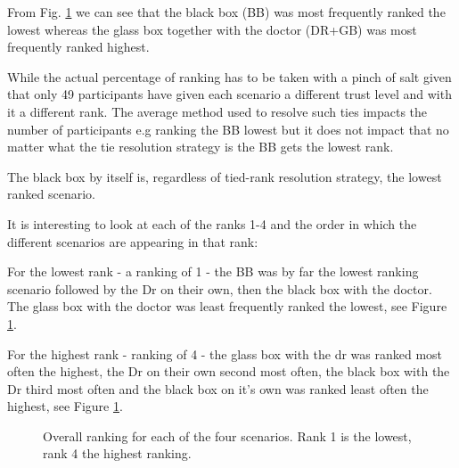 \documentclass[manuscript,screen,review]{acmart}
\begin{document}
From Fig. \ref{fig:overall-ranking} we can see that the black box (BB) was most frequently ranked the lowest whereas the glass box together with the doctor (DR+GB) was most frequently ranked highest.

While the actual percentage of ranking has to be taken with a pinch of salt given that only 49 participants have given each scenario a different trust level and with it a different rank. The average method used to resolve such ties impacts the number of participants e.g ranking the BB lowest but it does not impact that no matter what the tie resolution strategy is the BB gets the lowest rank.

The black box by itself is, regardless of tied-rank resolution strategy, the lowest ranked scenario.

It is interesting to look at each of the ranks 1-4 and the order in which the different scenarios are appearing in that rank:

For the lowest rank - a ranking of 1 - the BB was by far the lowest ranking scenario followed by the Dr on their own, then the black box with the doctor. The glass box with the doctor was  least frequently ranked the lowest, see Figure \ref{fig:overall-ranking}.

For the highest rank - ranking of 4 - the glass box with the dr was ranked most often the highest, the Dr on their own second most often, the black box with the Dr third most often and the black box on it's own was ranked least often the highest, see Figure \ref{fig:overall-ranking}.

\begin{figure}[h]
    \caption{Overall ranking for each of the four scenarios. Rank 1 is the lowest, rank 4 the highest ranking.}
    \label{fig:overall-ranking}
\end{figure}
\end{document}
